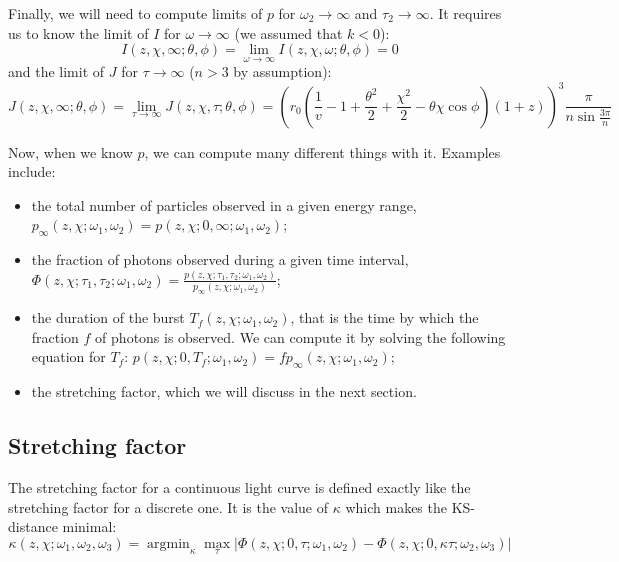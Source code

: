 \documentclass{article}
\DeclareMathOperator*{\argmin}{argmin}
\begin{document}
Finally, we will need to compute limits of $p$ for $\omega_2 \rightarrow \infty$ and $\tau_2 \rightarrow \infty$. It requires us to know the limit of $I$ for $\omega \rightarrow \infty$ (we assumed that $k < 0$):
\begin{equation}
I\left(z,\chi,\infty;\theta,\phi\right) = \lim_{\omega \rightarrow \infty} I\left(z,\chi,\omega;\theta,\phi\right) = 0
\end{equation}
and the limit of $J$ for $\tau \rightarrow \infty$ ($n > 3$ by assumption):
\begin{equation}
J\left(z,\chi,\infty;\theta,\phi\right) = \lim_{\tau \rightarrow \infty} J\left(z,\chi,\tau;\theta,\phi\right) = \left(r_0 \left( \frac{1}{v} -  1 + \frac{\theta^2}{2} + \frac{\chi^2}{2} - \theta\chi\cos\phi \right) \left(1+z\right)\right)^3 \frac{\pi}{n\sin\frac{3\pi}{n}}
\end{equation}

Now, when we know $p$, we can compute many different things with it. Examples include:
\begin{itemize}
\item{the total number of particles observed in a given energy range, $p_\infty\left(z,\chi; \omega_1,\omega_2\right) = p\left( z,\chi; 0,\infty; \omega_1,\omega_2 \right)$;}
\item{the fraction of photons observed during a given time interval, $\Phi\left(z,\chi; \tau_1,\tau_2; \omega_1,\omega_2\right) = \frac{p\left( z,\chi; \tau_1,\tau_2; \omega_1,\omega_2\right)}{p_\infty\left( z,\chi; \omega_1,\omega_2 \right)}$;}
\item{the duration of the burst $T_f\left( z,\chi;\omega_1,\omega_2 \right)$, that is the time by which the fraction $f$ of photons is observed. We can compute it by solving the following equation for $T_f$: $p\left( z,\chi; 0,T_f; \omega_1,\omega_2\right) = f p_\infty\left( z,\chi; \omega_1,\omega_2 \right)$;}
\item{the stretching factor, which we will discuss in the next section.}
\end{itemize}

\subsection{Stretching factor}
The stretching factor for a continuous light curve is defined exactly like the stretching factor for a discrete one. It is the value of $\kappa$ which makes the KS-distance minimal:
\begin{equation}
\kappa\left(z,\chi; \omega_1, \omega_2, \omega_3\right) = \argmin_\kappa \max_\tau\left| \Phi\left(z,\chi; 0,\tau; \omega_1,\omega_2\right) - \Phi\left( z,\chi; 0,\kappa \tau; \omega_2,\omega_3 \right) \right|
\end{equation}
\end{document}
